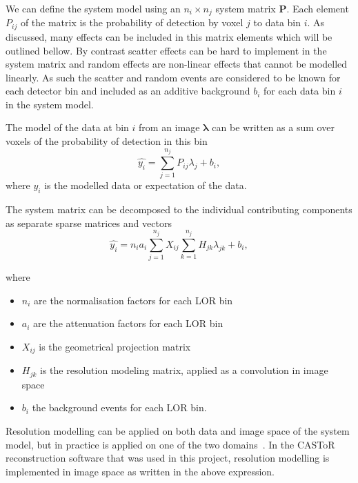 We can define the system model using an $n_i \times n_j$ system matrix $\bm{P}$. Each element $P_{ij}$ of the matrix is the probability of detection by voxel $j$ to data bin $i$. 
As discussed, many effects can be included in this matrix elements which will be outlined bellow. By contrast scatter effects can be hard to implement in the system matrix and random effects are non-linear effects that cannot be modelled linearly. As such the scatter and random events are considered to be known for each detector bin and included as an additive background $b_i$ for each data bin $i$ in the system model.

The model of the data at bin $i$ from an image $\bm{\lambda}$ can be written as a sum over voxels of the probability of detection in this bin 
\begin{equation}
   \hat{y_i} = \sum_{j=1}^{n_j} P_{ij} \lambda_j + b_i ,
   \label{eqn:system_model}
\end{equation}
where $\hat{y_i}$ is the modelled data or expectation of the data.

The system matrix can be decomposed to the individual contributing components as separate sparse matrices and vectors
\begin{equation}
   \hat{y_i} = n_i a_i \sum_{j=1}^{n_j} X_{ij} \sum_{k=1}^{n_j} H_{jk} \lambda_{jk} + b_i ,
\end{equation}

where
\begin{itemize}
    \item $n_i$ are the normalisation factors for each LOR bin
    \item $a_i$ are the attenuation factors for each LOR bin
    \item $X_{ij}$ is the geometrical projection matrix
    \item $H_{jk}$ is the resolution modeling matrix, applied as a convolution in image space
    \item $b_i$ the background events for each LOR bin.
\end{itemize}

Resolution modelling can be applied on both data and image space of the system model, but in practice is applied on one of the two domains~\cite{Stute2013}. In the CASToR reconstruction software that was used in this project, resolution modelling is implemented in image space as written in the above expression.

